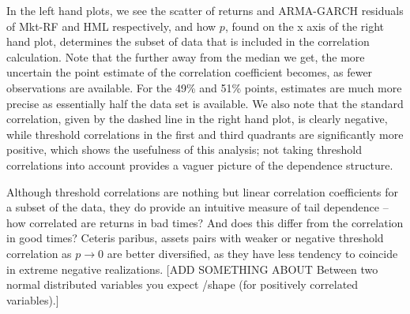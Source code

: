 In the left hand plots, we see the scatter of returns and ARMA-GARCH residuals of Mkt-RF and HML respectively, and how $p$, found on the x axis of the right hand plot, determines the subset of data that is included in the correlation calculation. Note that the further away from the median we get, the more uncertain the point estimate of the correlation coefficient becomes, as fewer observations are available. For the 49\% and 51\% points, estimates are much more precise as essentially half the data set is available. We also note that the standard correlation, given by the dashed line in the right hand plot, is clearly negative, while threshold correlations in the first and third quadrants are significantly more positive, which shows the usefulness of this analysis; not taking threshold correlations into account provides a vaguer picture of the dependence structure.

Although threshold correlations are nothing but linear correlation coefficients for a subset of the data, they do provide an intuitive measure of tail dependence -- how correlated are returns in bad times? And does this differ from the correlation in good times? Ceteris paribus, assets pairs with weaker or negative threshold correlation as $p \rightarrow 0$ are better diversified, as they have less tendency to coincide in extreme negative realizations. [ADD SOMETHING ABOUT Between two normal distributed variables you expect /\-shape (for positively correlated variables).]

